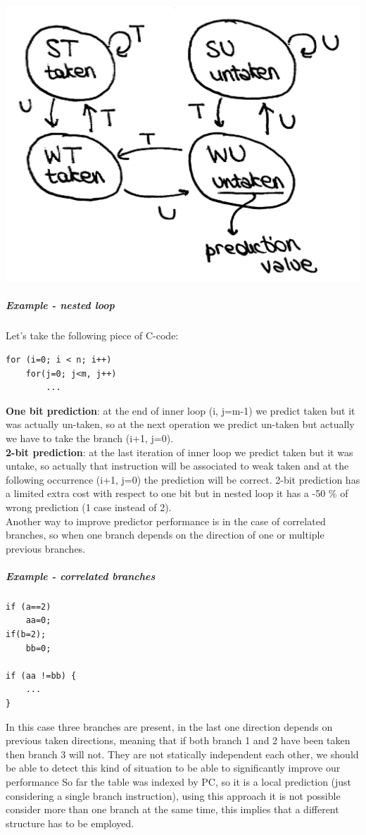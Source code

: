 \begin{center}
  \includegraphics[width=0.6\linewidth]{img/img3/17}
\end{center}

\subparagraph{Example - nested loop}

Let's take the following piece of C-code:
\begin{verbatim}
for (i=0; i < n; i++)
    for(j=0; j<m, j++)
        ...
\end{verbatim}

\textbf{One bit prediction}: at the end of inner loop (i, j=m-1) we predict taken but it was actually un-taken, so at the next operation we predict un-taken but actually we have to take the branch (i+1, j=0).\\
\textbf{2-bit prediction}: at the last iteration of inner loop we predict taken but it was untake, so actually that instruction will be associated to weak taken and at the following occurrence (i+1, j=0) the prediction will be correct. 2-bit prediction has a limited extra cost with respect to one bit but in nested loop it has a -50 \% of wrong prediction (1 case instead of 2).\\

Another way to improve predictor performance is in the case of correlated branches, so when one branch depends on the direction of one or multiple previous branches.

\subparagraph{Example - correlated branches}

\begin{verbatim}
if (a==2)
    aa=0;
if(b=2);
    bb=0;

if (aa !=bb) {
    ...
}
\end{verbatim}

In this case three branches are present, in the last one direction depends on previous taken directions, meaning that if both branch 1 and 2 have been taken then branch 3 will not.
They are not statically independent each other, we should be able to detect this kind of situation to be able to significantly improve our performance So far the table was indexed by PC, so it is a local prediction (just considering a single branch instruction), using this approach it is not possible consider more than one branch at the same time, this implies that a different structure has to be employed.

